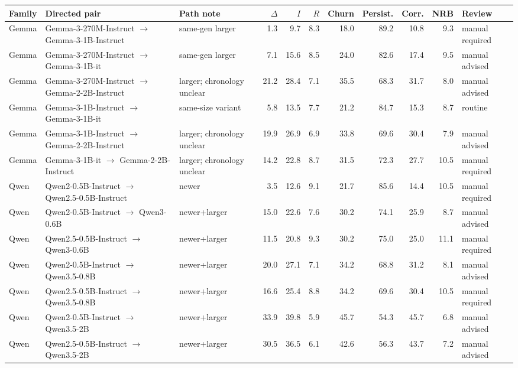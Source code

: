 \begin{tabular}{lllrrrrrrrl}
\toprule
Family & Directed pair & Path note & $\Delta$ & $I$ & $R$ & Churn & Persist. & Corr. & NRB & Review \\
\midrule
Gemma & Gemma-3-270M-Instruct $\rightarrow$ Gemma-3-1B-Instruct & same-gen larger & 1.3 & 9.7 & 8.3 & 18.0 & 89.2 & 10.8 & 9.3 & manual required \\
Gemma & Gemma-3-270M-Instruct $\rightarrow$ Gemma-3-1B-it & same-gen larger & 7.1 & 15.6 & 8.5 & 24.0 & 82.6 & 17.4 & 9.5 & manual advised \\
Gemma & Gemma-3-270M-Instruct $\rightarrow$ Gemma-2-2B-Instruct & larger; chronology unclear & 21.2 & 28.4 & 7.1 & 35.5 & 68.3 & 31.7 & 8.0 & manual advised \\
Gemma & Gemma-3-1B-Instruct $\rightarrow$ Gemma-3-1B-it & same-size variant & 5.8 & 13.5 & 7.7 & 21.2 & 84.7 & 15.3 & 8.7 & routine \\
Gemma & Gemma-3-1B-Instruct $\rightarrow$ Gemma-2-2B-Instruct & larger; chronology unclear & 19.9 & 26.9 & 6.9 & 33.8 & 69.6 & 30.4 & 7.9 & manual advised \\
Gemma & Gemma-3-1B-it $\rightarrow$ Gemma-2-2B-Instruct & larger; chronology unclear & 14.2 & 22.8 & 8.7 & 31.5 & 72.3 & 27.7 & 10.5 & manual required \\
Qwen & Qwen2-0.5B-Instruct $\rightarrow$ Qwen2.5-0.5B-Instruct & newer & 3.5 & 12.6 & 9.1 & 21.7 & 85.6 & 14.4 & 10.5 & manual required \\
Qwen & Qwen2-0.5B-Instruct $\rightarrow$ Qwen3-0.6B & newer+larger & 15.0 & 22.6 & 7.6 & 30.2 & 74.1 & 25.9 & 8.7 & manual advised \\
Qwen & Qwen2.5-0.5B-Instruct $\rightarrow$ Qwen3-0.6B & newer+larger & 11.5 & 20.8 & 9.3 & 30.2 & 75.0 & 25.0 & 11.1 & manual required \\
Qwen & Qwen2-0.5B-Instruct $\rightarrow$ Qwen3.5-0.8B & newer+larger & 20.0 & 27.1 & 7.1 & 34.2 & 68.8 & 31.2 & 8.1 & manual advised \\
Qwen & Qwen2.5-0.5B-Instruct $\rightarrow$ Qwen3.5-0.8B & newer+larger & 16.6 & 25.4 & 8.8 & 34.2 & 69.6 & 30.4 & 10.5 & manual required \\
Qwen & Qwen2-0.5B-Instruct $\rightarrow$ Qwen3.5-2B & newer+larger & 33.9 & 39.8 & 5.9 & 45.7 & 54.3 & 45.7 & 6.8 & manual advised \\
Qwen & Qwen2.5-0.5B-Instruct $\rightarrow$ Qwen3.5-2B & newer+larger & 30.5 & 36.5 & 6.1 & 42.6 & 56.3 & 43.7 & 7.2 & manual advised \\

\end{tabular}
